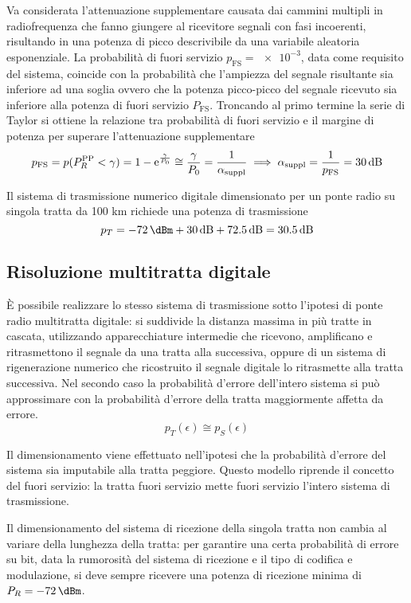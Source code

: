Va considerata l'attenuazione supplementare causata dai cammini multipli in radiofrequenza che fanno giungere al ricevitore segnali con fasi incoerenti, risultando in una potenza di picco descrivibile da una variabile aleatoria esponenziale. La probabilità di fuori servizio $p_\text{FS}=\num{e-3}$, data come requisito del sistema, coincide con la probabilità che l'ampiezza del segnale risultante sia inferiore ad una soglia ovvero che la potenza picco-picco del segnale ricevuto sia inferiore alla potenza di fuori servizio $P_\text{FS}$. Troncando al primo termine la serie di Taylor si ottiene la relazione tra probabilità di fuori servizio e il margine di potenza per superare l'attenuazione supplementare
\[ p_\text{FS}=p(P_R^\text{PP}<\gamma)=1-\e{\frac{\gamma}{P_0}}\cong\frac{\gamma}{P_0}=\frac{1}{\alpha_\text{suppl}}\implies\alpha_\text{suppl}=\frac{1}{p_\text{FS}}=\SI{30}{\decibel}\]

Il sistema di trasmissione numerico digitale dimensionato per un ponte radio su singola tratta da 100 km richiede una potenza di trasmissione 
\[p_T=\SI{-72}{\dBm}+\SI{30}{\decibel}+\SI{72.5}{\decibel}=\SI{30.5}{\decibel}\]

\subsection{Risoluzione multitratta digitale}
\`{E} possibile realizzare lo stesso sistema di trasmissione sotto l'ipotesi di ponte radio multitratta digitale: si suddivide la distanza massima in più tratte in cascata, utilizzando apparecchiature intermedie che ricevono, amplificano e ritrasmettono il segnale da una tratta alla successiva, oppure di un sistema di rigenerazione numerico che ricostruito il segnale digitale lo ritrasmette alla tratta successiva. Nel secondo caso la probabilità d'errore dell'intero sistema si può approssimare con la probabilità d'errore della tratta maggiormente affetta da errore.
\[p_T(\epsilon)\cong p_S(\epsilon)\]

Il dimensionamento viene effettuato nell'ipotesi che la probabilità d'errore del sistema sia imputabile alla tratta peggiore. Questo modello riprende il concetto del fuori servizio: la tratta fuori servizio mette fuori servizio l'intero sistema di trasmissione.

Il dimensionamento del sistema di ricezione della singola tratta non cambia al variare della lunghezza della tratta: per garantire una certa probabilità di errore su bit, data la rumorosità del sistema di ricezione e il tipo di codifica e modulazione, si deve sempre ricevere una potenza di ricezione minima di $P_R=\SI{-72}{\dBm}$.

